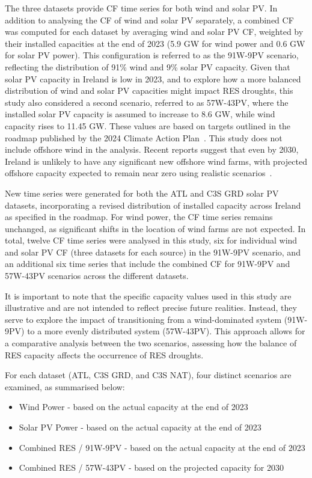 \documentclass[preprint, 12pt]{elsarticle}
\begin{document}
The three datasets provide CF time series for both wind and solar PV. In addition to analysing the CF of wind and solar PV separately, a combined CF was computed for each dataset by averaging wind and solar PV CF, weighted by their installed capacities at the end of 2023 (5.9 GW for wind power and 0.6 GW for solar PV power). This configuration is referred to as the 91W-9PV scenario, reflecting the distribution of 91\% wind and 9\% solar PV capacity. Given that solar PV capacity in Ireland is low in 2023, and to explore how a more balanced distribution of wind and solar PV capacities might impact RES droughts, this study also considered a second scenario, referred to as 57W-43PV, where the installed solar PV capacity is assumed to increase to 8.6 GW, while wind capacity rises to 11.45 GW. These values are based on targets outlined in the roadmap published by the 2024 Climate Action Plan~\citep{cap2024future}. This study does not include offshore wind in the analysis. Recent reports suggest that even by 2030, Ireland is unlikely to have any significant new offshore wind farms, with projected offshore capacity expected to remain near zero using realistic scenarios~\citep{seai2024future}.

New time series were generated for both the ATL and C3S GRD solar PV datasets, incorporating a revised distribution of installed capacity across Ireland as specified in the roadmap. For wind power, the CF time series remains unchanged, as significant shifts in the location of wind farms are not expected. In total, twelve CF time series were analysed in this study, six for individual wind and solar PV CF (three datasets for each source) in the 91W-9PV scenario, and an additional six time series that include the combined CF for 91W-9PV and 57W-43PV scenarios across the different datasets.

It is important to note that the specific capacity values used in this study are illustrative and are not intended to reflect precise future realities. Instead, they serve to explore the impact of transitioning from a wind-dominated system (91W-9PV) to a more evenly distributed system (57W-43PV). This approach allows for a comparative analysis between the two scenarios, assessing how the balance of RES capacity affects the occurrence of RES droughts.

For each dataset (ATL, C3S GRD, and C3S NAT), four distinct scenarios are examined, as summarised below:

\begin{itemize}
	\item Wind Power - based on the actual capacity at the end of 2023
	\item Solar PV Power - based on the actual capacity at the end of 2023
	\item Combined RES / 91W-9PV - based on the actual capacity at the end of 2023
	\item Combined RES / 57W-43PV - based on the projected capacity for 2030
\end{itemize}
\end{document}
